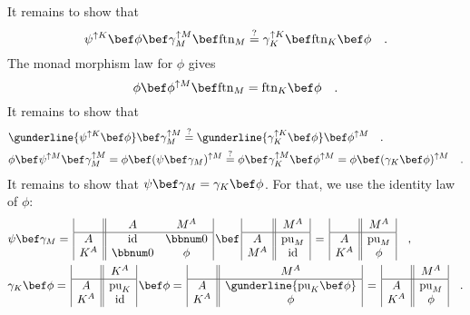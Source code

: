 It remains to show that
\[
\psi^{\uparrow K}\bef\phi\bef\gamma_{M}^{\uparrow M}\bef\text{ftn}_{M}\overset{?}{=}\gamma_{K}^{\uparrow K}\bef\text{ftn}_{K}\bef\phi\quad.
\]
The monad morphism law for $\phi$ gives
\[
\phi\bef\phi^{\uparrow M}\bef\text{ftn}_{M}=\text{ftn}_{K}\bef\phi\quad.
\]
It remains to show that
\begin{align*}
 & \gunderline{\psi^{\uparrow K}\bef\phi}\bef\gamma_{M}^{\uparrow M}\overset{?}{=}\gunderline{\gamma_{K}^{\uparrow K}\bef\phi}\bef\phi^{\uparrow M}\quad.\\
 & \phi\bef\psi^{\uparrow M}\bef\gamma_{M}^{\uparrow M}=\phi\bef(\psi\bef\gamma_{M})^{\uparrow M}\overset{?}{=}\phi\bef\gamma_{K}^{\uparrow M}\bef\phi^{\uparrow M}=\phi\bef(\gamma_{K}\bef\phi)^{\uparrow M}\quad.
\end{align*}
It remains to show that $\psi\bef\gamma_{M}=\gamma_{K}\bef\phi$.
For that, we use the identity law of $\phi$:
\begin{align*}
 & \psi\bef\gamma_{M}=\,\begin{array}{|c||cc|}
 & A & M^{A}\\
\hline A & \text{id} & \bbnum 0\\
K^{A} & \bbnum 0 & \phi
\end{array}\,\bef\,\begin{array}{|c||c|}
 & M^{A}\\
\hline A & \text{pu}_{M}\\
M^{A} & \text{id}
\end{array}\,=\,\begin{array}{|c||c|}
 & M^{A}\\
\hline A & \text{pu}_{M}\\
K^{A} & \phi
\end{array}\quad,\\
 & \gamma_{K}\bef\phi=\,\begin{array}{|c||c|}
 & K^{A}\\
\hline A & \text{pu}_{K}\\
K^{A} & \text{id}
\end{array}\,\bef\phi=\,\begin{array}{|c||c|}
 & M^{A}\\
\hline A & \gunderline{\text{pu}_{K}\bef\phi}\\
K^{A} & \phi
\end{array}\,=\,\begin{array}{|c||c|}
 & M^{A}\\
\hline A & \text{pu}_{M}\\
K^{A} & \phi
\end{array}\quad.
\end{align*}


